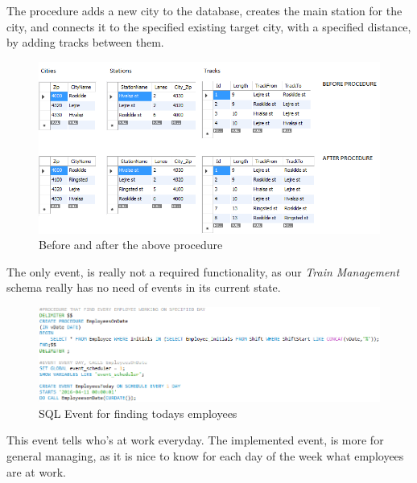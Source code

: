 The procedure adds a new city to the database, creates the main station for the city, and connects it to the specified existing target city, with a specified distance, by adding tracks between them.

\begin{figure}[ht!]
    \centering
    \includegraphics[width=1\textwidth]{img/SQL_PROCEDURE_AddCityConnect_example}
    \caption{Before and after the above procedure}
\end{figure}
\newpage

The only event, is really not a required functionality, as our \emph{Train Management} schema really has no need of events in its current state. 

\begin{figure}[ht!]
    \centering
    \includegraphics[width=1\textwidth]{img/SQL_EVENT}
    \caption{SQL Event for finding todays employees}
\end{figure}

This event tells who's at work everyday.
The implemented event, is more for general managing, as it is nice to know for each day of the week what employees are at work.